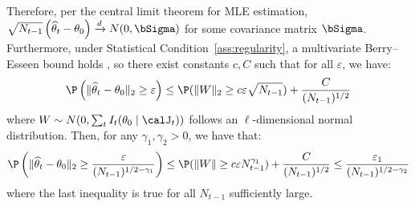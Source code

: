 \documentclass[blindrev]{informs3noheader}
\begin{document}
Therefore, per the central limit theorem for MLE estimation, $\sqrt{N_{t-1}}\left(\widehat{\theta}_t -\theta_0\right)\xrightarrow{d} N(0,\bSigma)$ for some covariance matrix $\bSigma$. Furthermore, under Statistical Condition~\ref{ass:regularity}, a multivariate Berry--Esseen bound holds \citep[e.g.][]{raivc2019multivariate}, so there exist constants $c, C$ such that for all $\varepsilon$, we have:
   \begin{equation*}
\P\left(\|\widehat{\theta}_t-\theta_0\|_2\geq \varepsilon \right)\leq \P(\|W\|_2\geq c\varepsilon \sqrt{N_{t-1}})  + \frac{C}{(N_{t-1})^{1/2}}
    \end{equation*}
where $W \sim N(0,\sum_t I_t(\theta_0 \mid \calJ_t))$ follows an $\ell$-dimensional normal distribution. Then, for any $\gamma_1,\gamma_2>0$, we have that:
    \begin{equation*}
\P\left(\|\widehat{\theta}_t-\theta_0\|_2\geq  \frac{\varepsilon}{(N_{t-1})^{1/2-\gamma_1}}\right)\leq \P(\|W\|\geq c\varepsilon N_{t-1}^{\gamma_1})  + \frac{C}{(N_{t-1})^{1/2}}\leq \frac{\varepsilon_1}{(N_{t-1})^{1/2-\gamma_2}}
    \end{equation*}
    where the last inequality is true for all $N_{t-1}$ sufficiently large.
\hfill\Halmos
\end{document}
